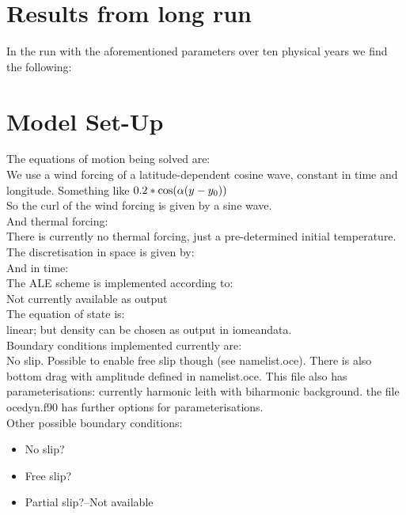 \documentclass[10pt]{article}
\begin{document}
\section{Results from long run}

In the run with the aforementioned parameters over ten physical years we find the following: 

\section{Model Set-Up}

The equations of motion being solved are:\\
\linebreak
We use a wind forcing of a latitude-dependent cosine wave, constant in time and longitude. Something like $0.2*\cos(\alpha(y-y_{0}))$\\
\linebreak
So the curl of the wind forcing is given by a sine wave.\\
\linebreak
And thermal forcing:\\
There is currently no thermal forcing, just a pre-determined initial temperature.\\
\linebreak
The discretisation in space is given by:\\
\linebreak
And in time:\\
\linebreak
The ALE scheme is implemented according to:\\
Not currently available as output\\
\linebreak
The equation of state is:\\
linear; but density can be chosen as output in io\textunderscore meandata. \\
\linebreak
Boundary conditions implemented currently are:\\
No slip. Possible to enable free slip though (see namelist.oce). There is also bottom drag with amplitude defined in namelist.oce. This file also has parameterisations: currently harmonic leith with biharmonic background. the file oce\textunderscore dyn.f90 has further options for parameterisations.\\
\linebreak
Other possible boundary conditions:
\begin{itemize}
	\item No slip?\\
	\item Free slip?\\
	\item Partial slip?--Not available
\end{itemize}
\end{document}
